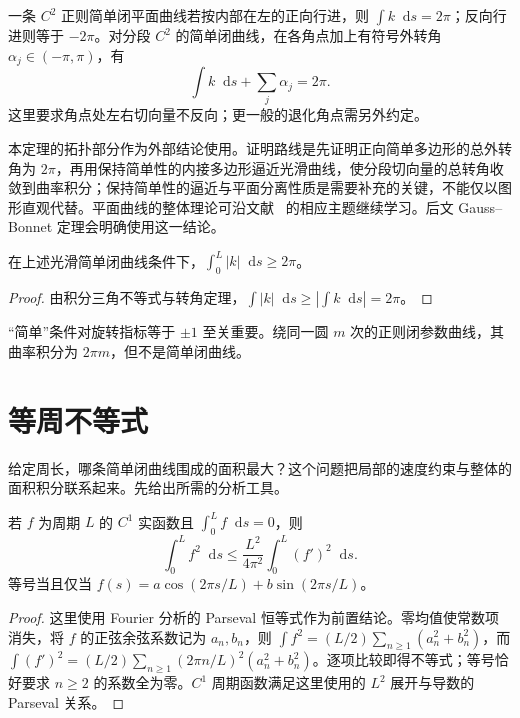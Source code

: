 \documentclass[UTF8,12pt,a4paper,fontset=fandol]{ctexbook}
\newcommand{\dd}{\mathop{}\!\mathrm d}
\begin{document}
\begin{theorem}[简单闭曲线的转角定理]
一条 $C^2$ 正则简单闭平面曲线若按内部在左的正向行进，则 $\int k\dd s=2\pi$；反向行进则等于 $-2\pi$。对分段 $C^2$ 的简单闭曲线，在各角点加上有符号外转角 $\alpha_j\in(-\pi,\pi)$，有
\begin{equation}
 \int k\dd s+\sum_j\alpha_j=2\pi.
 \label{eq:dg-turning}
\end{equation}
这里要求角点处左右切向量不反向；更一般的退化角点需另外约定。
\label{thm:dg-turning}
\end{theorem}
本定理的拓扑部分作为外部结论使用。证明路线是先证明正向简单多边形的总外转角为 $2\pi$，再用保持简单性的内接多边形逼近光滑曲线，使分段切向量的总转角收敛到曲率积分；保持简单性的逼近与平面分离性质是需要补充的关键，不能仅以图形直观代替。平面曲线的整体理论可沿文献~\cite{mit-notes,docarmo} 的相应主题继续学习。后文 Gauss--Bonnet 定理会明确使用这一结论。

\begin{corollary}[简单闭曲线的总绝对曲率下界]
在上述光滑简单闭曲线条件下，$\int_0^L|k|\dd s\ge2\pi$。
\end{corollary}
\begin{proof}
由积分三角不等式与转角定理，$\int|k|\dd s\ge|\int k\dd s|=2\pi$。
\end{proof}
“简单”条件对旋转指标等于 $\pm1$ 至关重要。绕同一圆 $m$ 次的正则闭参数曲线，其曲率积分为 $2\pi m$，但不是简单闭曲线。

\section{等周不等式}
给定周长，哪条简单闭曲线围成的面积最大？这个问题把局部的速度约束与整体的面积积分联系起来。先给出所需的分析工具。
\begin{lemma}
若 $f$ 为周期 $L$ 的 $C^1$ 实函数且 $\int_0^Lf\dd s=0$，则
\begin{equation}
 \int_0^L f^2\dd s\le\frac{L^2}{4\pi^2}\int_0^L(f')^2\dd s.
 \label{eq:dg-wirtinger}
\end{equation}
等号当且仅当 $f(s)=a\cos(2\pi s/L)+b\sin(2\pi s/L)$。
\label{lem:dg-wirtinger}
\end{lemma}
\begin{proof}
这里使用 Fourier 分析的 Parseval 恒等式作为前置结论。零均值使常数项消失，将 $f$ 的正弦余弦系数记为 $a_n,b_n$，则 $\int f^2=(L/2)\sum_{n\ge1}(a_n^2+b_n^2)$，而 $\int(f')^2=(L/2)\sum_{n\ge1}(2\pi n/L)^2(a_n^2+b_n^2)$。逐项比较即得不等式；等号恰好要求 $n\ge2$ 的系数全为零。$C^1$ 周期函数满足这里使用的 $L^2$ 展开与导数的 Parseval 关系。
\end{proof}
\end{document}
